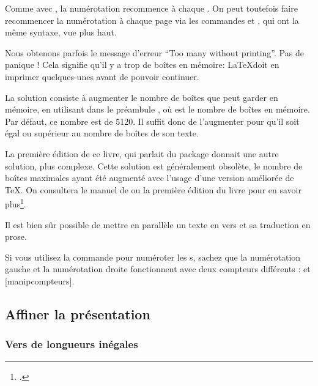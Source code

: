 \begin{attention}
Comme avec , la numérotation recommence à chaque . On peut toutefois faire recommencer la numérotation  à chaque page via les commandes  et , qui ont la même syntaxe, vue plus haut.
\end{attention}

Nous obtenons parfois le message d'erreur \enquote{Too many  without printing}. Pas de panique ! Cela signifie qu'il y a trop de boîtes en mémoire: \LaTeX  doit en imprimer quelques-unes avant de pouvoir continuer. 

La  solution consiste à  augmenter le nombre de boîtes que  peut garder en mémoire, en utilisant dans le préambule , où  est le nombre de boîtes en mémoire. Par défaut, ce nombre est de 5120. Il suffit donc de l'augmenter  pour qu'il soit égal ou supérieur au nombre de boîtes de son  texte. 

\begin{plusloins}
La première édition de ce livre, qui parlait du package  donnait une autre solution, plus complexe. Cette solution est généralement obsolète, le nombre de boîtes maximales ayant été augmenté avec l'usage d'une version améliorée de \TeX. On consultera le manuel de  ou la première édition du livre pour en savoir plus\footcites{reledpar}[176-178]{Rouquette2012}.
\end{plusloins}


\begin{plusloins}
Il est bien sûr possible de mettre en parallèle un texte en vers et sa traduction en prose. 
\end{plusloins}
\begin{plusloins}
Si vous utilisez la commande  pour numéroter les s, sachez que la numérotation gauche et la numérotation droite fonctionnent avec deux compteurs différents :  et [manipcompteurs].
\end{plusloins}




\subsection{Affiner la présentation}


\subsubsection{Vers de longueurs inégales}

